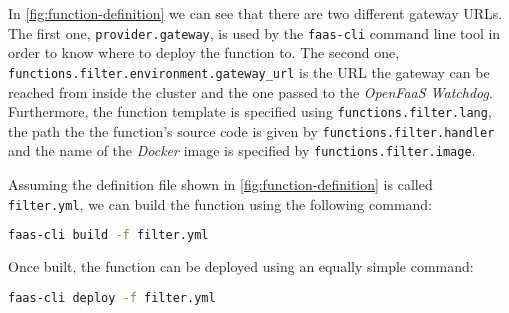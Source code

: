 In \autoref{fig:function-definition} we can see that there are two different gateway URLs. The
first one, \texttt{provider.gateway}, is used by the \texttt{faas-cli} command line tool in order to
know where to deploy the function to. The second one,
\texttt{functions.filter.environment.gateway\_url} is the URL the gateway can be reached from inside
the cluster and the one passed to the \textit{OpenFaaS Watchdog}. Furthermore, the function template
is specified using \texttt{functions.filter.lang}, the path the the function's source code is given
by \texttt{functions.filter.handler} and the name of the \textit{Docker} image is specified by
\texttt{functions.filter.image}.

Assuming the definition file shown in \autoref{fig:function-definition} is called
\texttt{filter.yml}, we can build the function using the following command:

\begin{lstlisting}[language=bash]
faas-cli build -f filter.yml
\end{lstlisting}

Once built, the function can be deployed using an equally simple command:

\begin{lstlisting}[language=bash]
faas-cli deploy -f filter.yml
\end{lstlisting}






